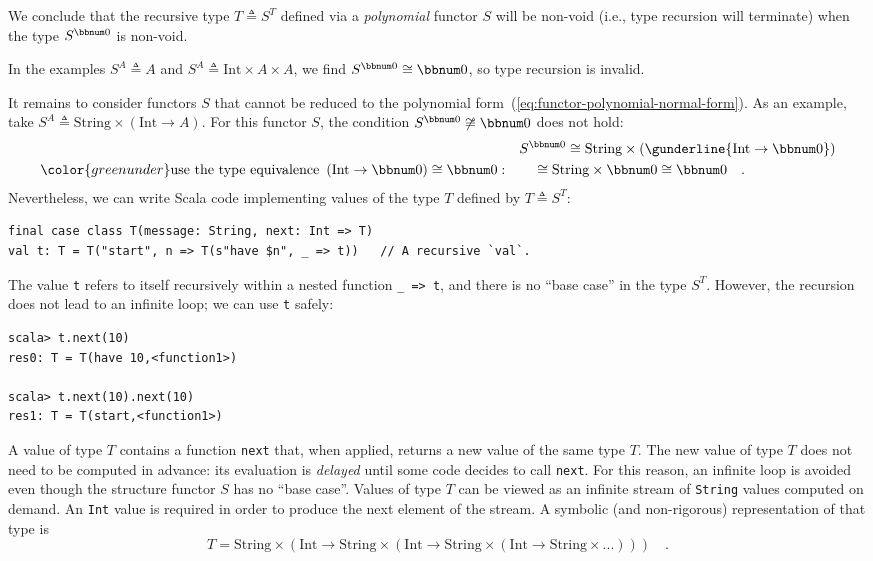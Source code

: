 We conclude that the recursive type $T\triangleq S^{T}$ defined via
a \emph{polynomial} functor $S$ will be non-void (i.e., type recursion
will terminate) when the type $S^{\bbnum 0}$ is non-void.

In the examples $S^{A}\triangleq A$ and $S^{A}\triangleq\text{Int}\times A\times A$,
we find $S^{\bbnum 0}\cong\bbnum 0$, so type recursion is invalid.

It remains to consider functors $S$ that cannot be reduced to the
polynomial form~(\ref{eq:functor-polynomial-normal-form}). As an
example, take $S^{A}\triangleq\text{String}\times(\text{Int}\rightarrow A)$.
For this functor $S$, the condition $S^{\bbnum 0}\not\cong\bbnum 0$
does not hold:
\begin{align*}
 & S^{\bbnum 0}\cong\text{String}\times(\gunderline{\text{Int}\rightarrow\bbnum 0})\\
{\color{greenunder}\text{use the type equivalence }\left(\text{Int}\rightarrow\bbnum 0\right)\cong\bbnum 0:}\quad & \quad\cong\text{String}\times\bbnum 0\cong\bbnum 0\quad.
\end{align*}
Nevertheless, we can write Scala code implementing values of the type
$T$ defined by $T\triangleq S^{T}$:
\begin{lstlisting}
final case class T(message: String, next: Int => T)
val t: T = T("start", n => T(s"have $n", _ => t))   // A recursive `val`.
\end{lstlisting}
The value \lstinline!t! refers to itself recursively within a nested
function \lstinline!_ => t!, and there is no \textsf{``}base case\textsf{''} in the
type $S^{T}$. However, the recursion does not lead to an infinite
loop; we can use \lstinline!t! safely:
\begin{lstlisting}
scala> t.next(10)
res0: T = T(have 10,<function1>)

scala> t.next(10).next(10)
res1: T = T(start,<function1>)
\end{lstlisting}
A value of type $T$ contains a function \lstinline!next! that, when
applied, returns a new value of the same type $T$. The new value
of type $T$ does not need to be computed in advance: its evaluation
is \emph{delayed} until some code decides to call \lstinline!next!.
For this reason, an infinite loop is avoided even though the structure
functor $S$ has no \textsf{``}base case\textsf{''}. Values of type $T$ can be viewed
as an infinite stream of \lstinline!String! values computed on demand.
An \lstinline!Int! value is required in order to produce the next
element of the stream. A symbolic (and non-rigorous) representation
of that type is
\[
T=\text{String}\times(\text{Int}\rightarrow\text{String}\times(\text{Int}\rightarrow\text{String}\times(\text{Int}\rightarrow\text{String}\times...)))\quad.
\]

